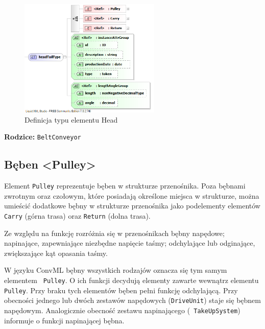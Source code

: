 \documentclass[12pt,a4paper]{article}
\begin{document}
\begin{figure}[H]
  \centering
  \includegraphics[width=0.6\textwidth]{png/liquid/headTailType}
  \caption{Definicja typu elementu Head}
  \label{fig:headTailType-xsd}
\end{figure}

\noindent\textbf{Rodzice:} \texttt{BeltConveyor}


\subsection{Bęben <Pulley>}
Element {\tt Pulley} reprezentuje bęben w strukturze przenośnika.  Poza bębnami
zwrotnym oraz czołowym, które posiadają określone miejsca w strukturze, można
umieścić dodatkowe bębny w strukturze przenośnika jako podelementy elementów
{\tt Carry} (górna trasa) oraz {\tt Return} (dolna trasa).

Ze względu na funkcję rozróżnia się w przenośnikach bębny napędowe; napinające,
zapewniające niezbędne napięcie taśmy; odchylające lub odginające, zwiększające
kąt opasania taśmy.

W języku ConvML bębny wszystkich rodzajów oznacza się tym samym elementem {\tt
  Pulley}.  O ich funkcji decydują elementy zawarte wewnątrz elementu {\tt
  Pulley}. Przy braku tych elementów bęben pełni funkcję odchylającą.  Przy
obecności jednego lub dwóch zestawów napędowych ({\tt DriveUnit}) staje się
bębnem napędowym.  Analogicznie obecność zestawu napinającego ({\tt
  TakeUpSystem}) informuje o funkcji napinającej bębna.
\end{document}
